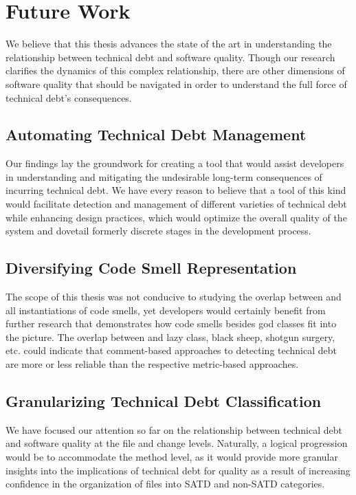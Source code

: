 \section{Future Work}

We believe that this thesis advances the state of the art in understanding the relationship between technical debt and software quality. Though our research clarifies the dynamics of this complex relationship, there are other dimensions of software quality that should be navigated in order to understand the full force of technical debt's consequences.

\subsection{Automating Technical Debt Management}

Our findings lay the groundwork for creating a tool that would assist developers in understanding and mitigating the undesirable long-term consequences of incurring technical debt. We have every reason to believe that a tool of this kind would facilitate detection and management of different varieties of technical debt while enhancing design practices, which would optimize the overall quality of the system and dovetail formerly discrete stages in the development process.


\subsection{Diversifying Code Smell Representation}

The scope of this thesis was not conducive to studying the overlap between \SATD and all instantiations of code smells, yet developers would certainly benefit from further research that demonstrates how code smells besides god classes fit into the picture. The overlap between \SATD and lazy class, black sheep, shotgun surgery, etc. could indicate that comment-based approaches to detecting technical debt are more or less reliable than the respective metric-based approaches.

\subsection{Granularizing Technical Debt Classification}

We have focused our attention so far on the relationship between technical debt and software quality at the file and change levels. Naturally, a logical progression would be to accommodate the method level, as it would provide more granular insights into the implications of technical debt for quality as a result of increasing confidence in the organization of files into SATD and non-SATD categories.
